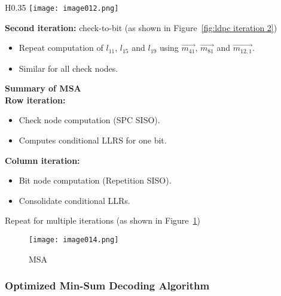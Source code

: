 \begin{wrapfigure}{H}{0.35\textwidth}
    \centering
    \texttt{[image: image012.png]}
    \caption{Second Iteration}
    \label{fig:ldpc iteration 2}
\end{wrapfigure}

\textbf{Second iteration:} check-to-bit (as shown in Figure~\ref{fig:ldpc iteration 2})
\begin{itemize}
    \item Repeat computation of $l_{11}$, $l_{15}$ and $l_{19}$ using $\overrightarrow{m_{41}}$, $\overrightarrow{m_{81}}$ and $\overrightarrow{m_{12,1}}$.
    \item Similar for all check nodes. 
\end{itemize}

\textbf{Summary of MSA} \\
\textbf{Row iteration:} \\
\begin{itemize}
    \item Check node computation (SPC SISO).
    \item Computes conditional LLRS for one bit.
\end{itemize}
\textbf{Column iteration:} \\
\begin{itemize}
    \item Bit node computation (Repetition SISO).
    \item Consolidate conditional LLRs.
\end{itemize}
Repeat for multiple iterations (as shown in Figure~\ref{fig:MSA})
\begin{figure}[ht]
    \centering
    \texttt{[image: image014.png]}
    \caption{MSA}
    \label{fig:MSA}
\end{figure}

\subsubsection{Optimized Min-Sum Decoding Algorithm}
